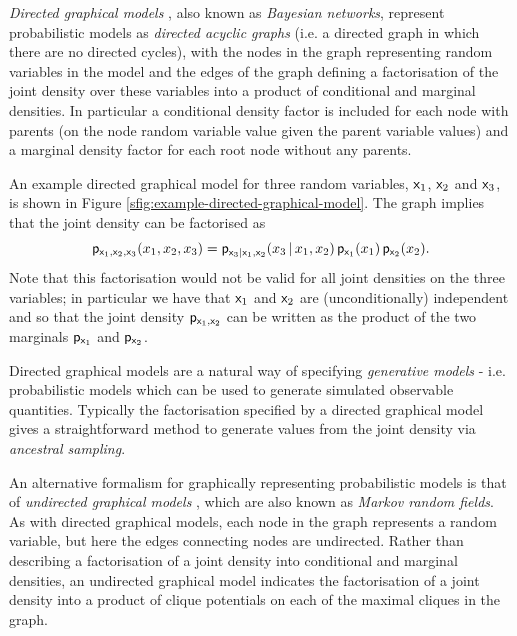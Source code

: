 \emph{Directed graphical models} \citep{pearl1988probabilistic}, also known as \emph{Bayesian networks}, represent probabilistic models as \emph{directed acyclic graphs} (i.e. a directed graph in which there are no directed cycles), with the nodes in the graph representing random variables in the model and the edges of the graph defining a factorisation of the joint density over these variables into a product of conditional and marginal densities. In particular a conditional density factor is included for each node with parents (on the node random variable value given the parent variable values) and a marginal density factor for each root node without any parents.

An example directed graphical model for three random variables, $\mathsf{x}_1$, $\mathsf{x}_2$ and $\mathsf{x}_3$, is shown in Figure \ref{sfig:example-directed-graphical-model}. The graph implies that the joint density can be factorised as
\begin{equation}\label{eq:example-directed-graphical-model-factorisation}
  \mathsf{p}_{\mathsf{x}_1,\mathsf{x}_2,\mathsf{x}_3}(x_1,x_2,x_3) = 
  \mathsf{p}_{\mathsf{x}_3|\mathsf{x}_1,\mathsf{x}_2}(x_3 \operatorname{|} x_1,x_2) \,
  \mathsf{p}_{\mathsf{x}_1}(x_1) \, \mathsf{p}_{\mathsf{x}_2}(x_2).
\end{equation}
Note that this factorisation would not be valid for all joint densities on the three variables; in particular we have that $\mathsf{x}_1$ and $\mathsf{x}_2$ are (unconditionally) independent and so that the joint density $\mathsf{p}_{\mathsf{x}_1,\mathsf{x}_2}$ can be written as the product of the two marginals $\mathsf{p}_{\mathsf{x}_1}$ and $\mathsf{p}_{\mathsf{x}_2}$.

Directed graphical models are a natural way of specifying \emph{generative models} - i.e. probabilistic models which can be used to generate simulated observable quantities. Typically the factorisation specified by a directed graphical model gives a straightforward method to generate values from the joint density via \emph{ancestral sampling}.

An alternative formalism for graphically representing probabilistic models is that of \emph{undirected graphical models} \citep{kindermann1980markov}, which are also known as \emph{Markov random fields}. As with directed graphical models, each node in the graph represents a random variable, but here the edges connecting nodes are undirected. Rather than describing a factorisation of a joint density into conditional and marginal densities, an undirected graphical model indicates the factorisation of a joint density into a product of clique potentials on each of the maximal cliques in the graph.

